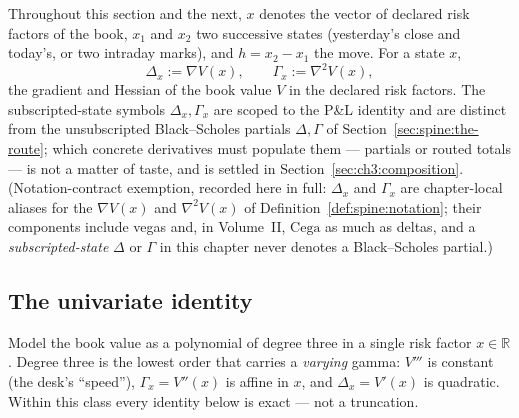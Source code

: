 \documentclass[11pt]{book}
\theoremstyle{plain}
\theoremstyle{definition}
\theoremstyle{remark}
\newcommand{\Cega}{\mathrm{Cega}}                %
\begin{document}
Throughout this section and the next, $x$ denotes the vector of declared risk
factors of the book, $x_1$ and $x_2$ two successive states (yesterday's close
and today's, or two intraday marks), and $h = x_2 - x_1$ the move. For a state
$x$,
\[
  \Delta_x := \nabla V(x), \qquad \Gamma_x := \nabla^2 V(x),
\]
the gradient and Hessian of the book value $V$ in the declared risk factors.
The subscripted-state symbols $\Delta_x, \Gamma_x$ are scoped to the P\&L
identity and are distinct from the unsubscripted Black--Scholes partials
$\Delta, \Gamma$ of Section~\ref{sec:spine:the-route}; which concrete
derivatives must populate them --- partials or routed totals --- is not a
matter of taste, and is settled in Section~\ref{sec:ch3:composition}.
(Notation-contract exemption, recorded here in full: $\Delta_x$ and
$\Gamma_x$ are chapter-local aliases for the $\nabla V(x)$ and
$\nabla^2 V(x)$ of Definition~\ref{def:spine:notation}; their components
include vegas and, in Volume~II, $\Cega$ as much as deltas, and a
\emph{subscripted-state} $\Delta$ or $\Gamma$ in this chapter never denotes
a Black--Scholes partial.)

\subsection{The univariate identity}\label{sec:ch3:univariate}

Model the book value as a polynomial of degree three in a single risk factor
$x \in \mathbb{R}$. Degree three is the lowest order that carries a
\emph{varying} gamma: $V'''$ is constant (the desk's ``speed''), $\Gamma_x =
V''(x)$ is affine in $x$, and $\Delta_x = V'(x)$ is quadratic. Within this
class every identity below is exact --- not a truncation.
\end{document}
